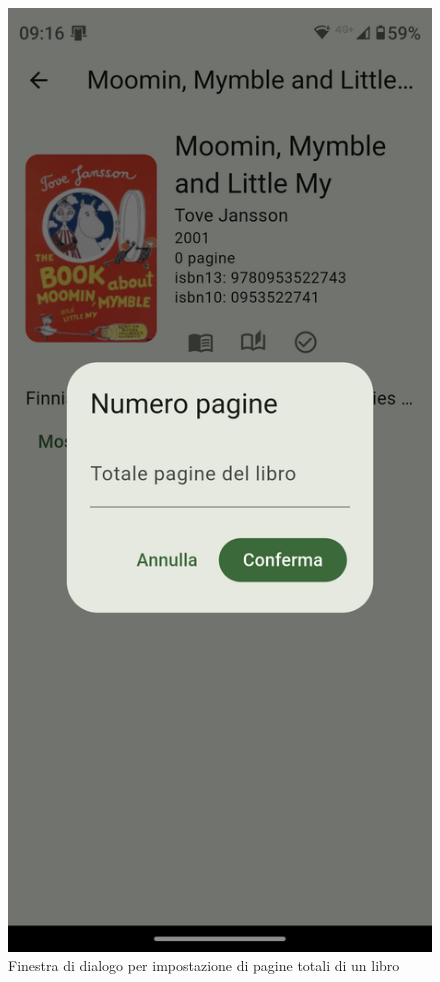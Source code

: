 \documentclass{article}
\begin{document}
\begin{figure}[H]
  \centering
  \includegraphics[width=0.6\linewidth]{set-pages-f.png}
  \caption{Finestra di dialogo per impostazione di pagine totali di un libro}
  \label{fig:sitemap}
\end{figure}
\end{document}
